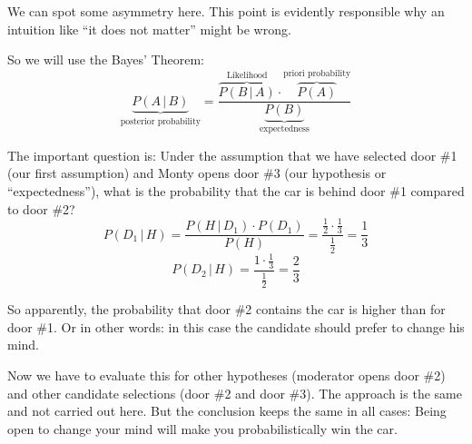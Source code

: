 \documentclass{article}
\newcommand{\Pc}[2]{P(#1\,|\,#2)}
\begin{document}
We can spot some asymmetry here. This point is evidently responsible why
an intuition like ``it does not matter'' might be wrong.

So we will use the Bayes' Theorem:
\[
    \underbrace{\Pc{A}{B}}_{\text{posterior probability}} =
      \frac{\overbrace{\Pc{B}{A}}^{\text{Likelihood}} \cdot
        \overbrace{P(A)}^{\text{priori probability}}
      }{
        \underbrace{P(B)}_{\text{expectedness}}
      }
\]

The important question is: Under the assumption that we have selected door \#1
(our first assumption) and Monty opens door \#3 (our hypothesis or
``expectedness''), what is the probability that the car is behind door \#1
compared to door \#2?
\[
    \Pc{D_1}{H} = \frac{\Pc{H}{D_1} \cdot P(D_1)}{P(H)}
        = \frac{\frac12 \cdot \frac13}{\frac12} = \frac13
\] \[
    \Pc{D_2}{H} = \frac{1 \cdot \frac13}{\frac12} = \frac23
\]

So apparently, the probability that door \#2 contains the car is higher than
for door \#1. Or in other words: in this case the candidate should prefer
to change his mind.

Now we have to evaluate this for other hypotheses (moderator opens door \#2)
and other candidate selections (door \#2 and door \#3). The approach is the
same and not carried out here. But the conclusion keeps the same in all cases:
Being open to change your mind will make you probabilistically win the car.
\end{document}
